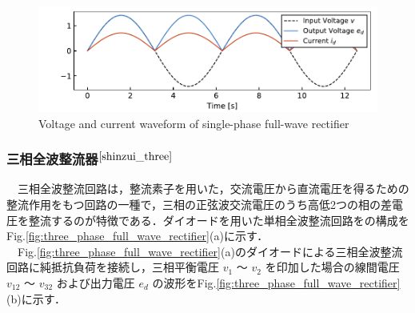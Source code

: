 \begin{figure}[H]
    \centering
    \includegraphics[width=15cm]{./fig/single_phase_full_wave_rectifier_graph.pdf}
    \caption{Voltage and current waveform of single-phase full-wave rectifier}
    \label{fig:single_phase_full_wave_rectifier_graph}
\end{figure}

\subsubsection{三相全波整流器$^{\cite{shinzui_three}}$}
　三相全波整流回路は，整流素子を用いた，交流電圧から直流電圧を得るための整流作用をもつ回路の一種で，三相の正弦波交流電圧のうち高低2つの相の差電圧を整流するのが特徴である．ダイオードを用いた単相全波整流回路をの構成をFig.\ref{fig:three_phase_full_wave_rectifier}(a)に示す．\\

　Fig.\ref{fig:three_phase_full_wave_rectifier}(a)のダイオードによる三相全波整流回路に純抵抗負荷を接続し，三相平衡電圧 $v_1$ 〜 $v_2$ を印加した場合の線間電圧 $v_{12}$ 〜 $v_{32}$ および出力電圧 $e_d$ の波形をFig.\ref{fig:three_phase_full_wave_rectifier}(b)に示す．\\

